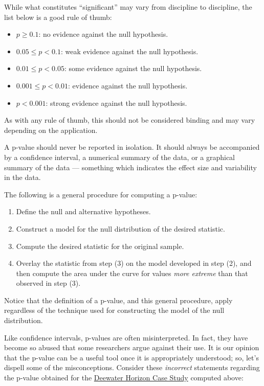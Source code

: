 \documentclass[]{book}
\providecommand{\tightlist}{%
  \setlength{\itemsep}{0pt}\setlength{\parskip}{0pt}}
\theoremstyle{plain}
\theoremstyle{mydefn}
\theoremstyle{myexmpl}
\theoremstyle{remark}
\let\BeginKnitrBlock\begin \let\EndKnitrBlock\end
\let\BeginKnitrBlock\begin \let\EndKnitrBlock\end
\begin{document}
\BeginKnitrBlock{rmdtip}
While what constitutes ``significant'' may vary from discipline to
discipline, the list below is a good rule of thumb:

\begin{itemize}
\tightlist
\item
  \(p \geq 0.1\): no evidence against the null hypothesis.
\item
  \(0.05 \leq p < 0.1\): weak evidence against the null hypothesis.
\item
  \(0.01 \leq p < 0.05\): some evidence against the null hypothesis.
\item
  \(0.001 \leq p < 0.01\): evidence against the null hypothesis.
\item
  \(p < 0.001\): strong evidence against the null hypothesis.
\end{itemize}

As with any rule of thumb, this should not be considered binding and may
vary depending on the application.
\EndKnitrBlock{rmdtip}

\BeginKnitrBlock{rmdtip}
A p-value should never be reported in isolation. It should always be
accompanied by a confidence interval, a numerical summary of the data,
or a graphical summary of the data --- something which indicates the
effect size and variability in the data.
\EndKnitrBlock{rmdtip}

\BeginKnitrBlock{rmdtip}
The following is a general procedure for computing a p-value:

\begin{enumerate}
\def\labelenumi{\arabic{enumi}.}
\tightlist
\item
  Define the null and alternative hypotheses.
\item
  Construct a model for the null distribution of the desired statistic.
\item
  Compute the desired statistic for the original sample.
\item
  Overlay the statistic from step (3) on the model developed in step
  (2), and then compute the area under the curve for values \emph{more
  extreme} than that observed in step (3).
\end{enumerate}

Notice that the definition of a p-value, and this general procedure,
apply regardless of the technique used for constructing the model of the
null distribution.
\EndKnitrBlock{rmdtip}

Like confidence intervals, p-values are often misinterpreted. In fact,
they have become so abused that some researchers argue against their
use. It is our opinion that the p-value can be a useful tool once it is
appropriately understood; so, let's dispell some of the misconceptions.
Consider these \emph{incorrect} statements regarding the p-value
obtained for the \protect\hyperlink{CaseDeepwater}{Deewater Horizon Case
Study} computed above:
\end{document}
